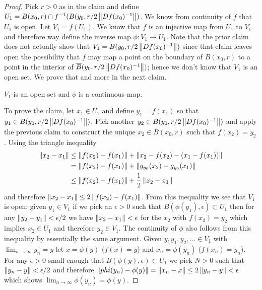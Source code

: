 \begin{proof}
Pick $r>0$ as in the claim and define $U_1 = B(x_0, r) \cap f^{-1}(B(y_0, r/2 \left \lVert Df(x_0)^{-1} \right \rVert)$.  We know from continuity of $f$ that $U_1$ is open.  Let $V_1 = f(U_1)$.  We know that $f$ is an injective map from $U_1$ to $V_1$ and therefore way define the inverse map $\phi : V_1 \to U_1$.  Note that the prior claim does not actually show that $V_1 = B(y_0, r/2 \left \lVert Df(x_0)^{-1} \right \rVert)$ since that claim leaves open the possibility that $f$ may map a point on the boundary of $\overline{B}(x_0, r)$ to a point in the interior of $\overline{B}(y_0, r/2 \left \lVert Df(x_0)^{-1} \right \rVert)$; hence we don't know that $V_1$ is an open set.  We prove that and more in the next claim.
\begin{clm}$V_1$ is an open set and $\phi$ is a continuous map. 
\end{clm}
 To prove the claim, let $x_1 \in U_1$ and define $y_1 = f(x_1)$ so that $y_1 \in B(y_0, r/2 \left \lVert Df(x_0)^{-1} \right \rVert)$.  Pick another $y_2 \in B(y_0, r/2 \left \lVert Df(x_0)^{-1} \right \rVert)$ and apply the previous claim to construct the unique $x_2 \in \overline{B}(x_0, r)$ such that $f(x_2) = y_2$.  Using the triangle inequality
\begin{align*}
\left \lVert x_2 - x_1 \right \rVert &\leq \left \lVert f(x_2) - f(x_1) \right \rVert + \left \lVert x_2 - f(x_2) - (x_1 - f(x_1)) \right \rVert \\
&= \left \lVert f(x_2) - f(x_1) \right \rVert + \left \lVert g_{y_0}(x_2) - g_{y_0}(x_1) \right \rVert \\
&\leq \left \lVert f(x_2) - f(x_1) \right \rVert + \frac{1}{2} \left \lVert x_2 - x_1 \right \rVert
\end{align*}
and therefore $\left \lVert x_2 - x_1 \right \rVert \leq 2 \left \lVert f(x_2) - f(x_1) \right \rVert$.  From this inequality we see that $V_1$ is open; given $y_1 \in V_1$ if we pick an $\epsilon > 0$ such that $B(\phi(y_1), \epsilon) \subset U_1$ then for any $\left \lVert y_2 - y_1 \right \rVert < \epsilon/2$ we have $\left \lVert x_2 - x_1 \right \rVert < \epsilon$ for the $x_2$ with $f(x_2) = y_2$ which implies $x_2 \in U_1$ and therefore $y_2 \in V_1$.  The continuity of $\phi$ also follows from this inequality by essentially the same argument.  Given $y, y_1, y_2, \dotsc \in V_1$ with $\lim_{n \to \infty} y_n = y$ let $x = \phi(y)$ ($f(x) = y$) and $x_n = \phi(y_n)$ ($f(x_n) = y_n$).  For any $\epsilon > 0$ small enough that $B(\phi(y), \epsilon) \subset U_1$ we pick $N > 0$ such that $\left \lVert y_n - y \right \rVert < \epsilon/2$ and therefore $\left \lVert phi(y_n) - \phi(y) \right \rVert = \left \lVert x_n - x \right \rVert \leq 2\left \lVert y_n - y \right \rVert < \epsilon$ which shows $\lim_{n \to \infty} \phi(y_n) = \phi(y)$.  


\end{proof}
